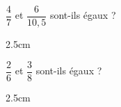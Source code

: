 \documentclass[a4paper]{book}
\begin{document}
    \begin{exemple}
        \begin{minipage}[t]{0.48\textwidth}
            $\dfrac{4}{7}$ et $\dfrac{6}{10,5}$ sont-ils égaux ?
            \begin{ZoneReponse}{2.5cm}
            \end{ZoneReponse}
        \end{minipage}
        \hfill \vline \hfill
        \begin{minipage}[t]{0.48\textwidth}
            $\dfrac{2}{6}$ et $\dfrac{3}{8}$ sont-ils égaux ?
            \begin{ZoneReponse}{2.5cm}
            \end{ZoneReponse}
        \end{minipage}
    \end{exemple}
\end{document}

